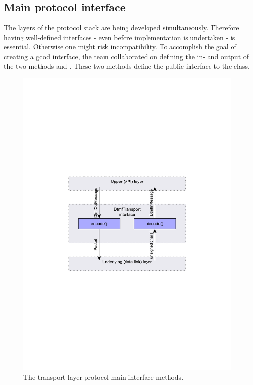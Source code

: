 \subsection{Main protocol interface}
The layers of the protocol stack are being developed simultaneously. Therefore having well-defined interfaces - even before implementation is undertaken - is essential. Otherwise one might risk incompatibility. To accomplish the goal of creating a good interface, the team collaborated on defining the in- and output of the two methods  and . These two methods define the public interface to the  class.

\begin{figure}[htb]
 \centering
 \includegraphics[scale=0.66,trim=0 280 0 275]{content/graphics/transport/trans_encode_decode.pdf}%
 \caption{The transport layer protocol main interface methods.}
 \label{fig:trans_encode_decode}
\end{figure}

